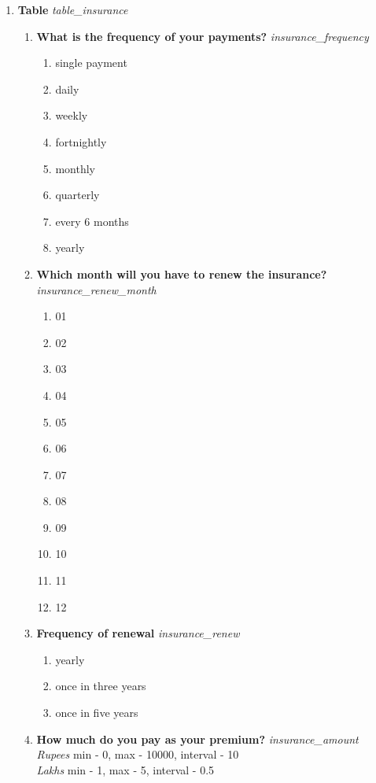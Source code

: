 \documentclass{article}
\begin{document}
\begin{enumerate}
\item {\bfseries Table}\emph{ table\_insurance }
\begin{enumerate}[label*=\arabic*.]
\item {\bfseries What is the frequency of your payments?}\emph{ insurance\_frequency }
\begin{enumerate}
\item single payment
\item daily
\item weekly
\item fortnightly
\item monthly
\item quarterly
\item every 6 months
\item yearly
\end{enumerate}
\item {\bfseries Which month will you have to renew the insurance?}\emph{ insurance\_renew\_month }
\begin{enumerate}
\item 01
\item 02
\item 03
\item 04
\item 05
\item 06
\item 07
\item 08
\item 09
\item 10
\item 11
\item 12
\end{enumerate}
\item {\bfseries Frequency of renewal}\emph{ insurance\_renew }
\begin{enumerate}
\item yearly
\item once in three years
\item once in five years
\end{enumerate}
\item {\bfseries How much do you pay as your premium?}\emph{ insurance\_amount }
\\ \emph{ Rupees }min - 0, max - 10000, interval - 10
\\ \emph{ Lakhs }min - 1, max - 5, interval - 0.5


\end{enumerate}
\end{enumerate}
\end{document}

